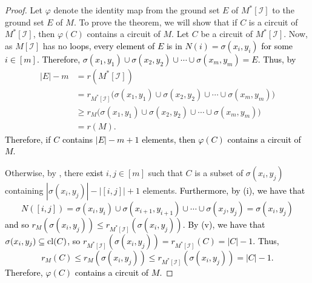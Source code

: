 \documentclass[11pt]{amsart}
\newcommand{\cl}{{\rm cl}}
\newcommand{\blue}{\textcolor{black}}
\newcommand{\bloo}{\textcolor{black}}
\begin{document}
\begin{proof}
Let $\varphi$ denote the identity map from the ground set $E$ of $M^*[\mathscr I]$ to the ground set $E$ of $M$. To prove the theorem, we will show that if $C$ is a circuit of $M^*[\mathscr I]$, then $\varphi(C)$ contains a circuit of $M$. Let $C$ be a circuit of $M^*[\mathscr I]$. Now, as $M[\mathscr I]$ has no \bloo{loops, every element of $E$ is in $N(i) = \sigma(x_i,y_i)$ for some $i \in [m]$. Therefore, $\sigma(x_1,y_1) \cup \sigma(x_2,y_2) \cup \cdots \cup \sigma(x_m,y_m) = E$. Thus, by }
\begin{align*}
|E|-m & = r(M^*[\mathscr I]) \\
& = r_{M^*[\mathscr I]}\big(\sigma(x_1, y_1)\cup \sigma(x_2, y_2)\cup \cdots\cup \sigma(x_m, y_m)\big) \\
& \ge r_M\big(\sigma(x_1, y_1)\cup \sigma(x_2, y_2)\cup \cdots\cup \sigma(x_m, y_m)\big) \\
& = r(M).
\end{align*}
\blue{Therefore, if $C$ contains $|E| - m + 1$ elements, then $\varphi(C)$ contains a circuit of $M$.}


Otherwise, by , there \bloo{exist} $i,j \in [m]$ such that $C$ is a subset of $\sigma(x_i,y_j)$ containing $|\sigma(x_i,y_j)|-|[i,j]|+1$ elements. \bloo{Furthermore, by (i), we have that
\[
N([i,j]) = \sigma(x_i,y_i) \cup \sigma(x_{i+1},y_{i+1}) \cup \cdots \cup \sigma(x_j,y_j) = \sigma(x_i,y_j)
\]
and so $r_M(\sigma(x_i,y_j)) \leq r_{M^*[\mathscr I]}(\sigma(x_i,y_j))$. By (v), we have that $\sigma(x_i,y_j) \subseteq \cl(C)$, so $r_{M^*[\mathscr I]}(\sigma(x_i,y_j)) = r_{M^*[\mathscr I]}(C) = |C|-1$.} \bloo{Thus, 
\[r_M(C) \leq r_M(\sigma(x_i,y_j)) \leq r_{M^*[\mathscr I]}(\sigma(x_i,y_j))=|C|-1.\]
Therefore, $\varphi(C)$ contains a circuit of $M$.}
\end{proof}

\end{document}
